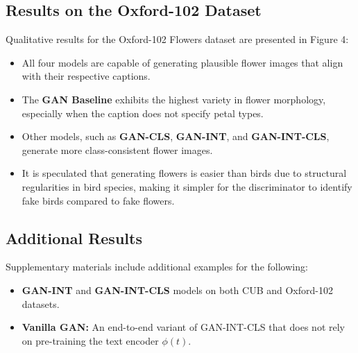\subsection*{Results on the Oxford-102 Dataset}
Qualitative results for the Oxford-102 Flowers dataset are presented in Figure 4:  
\begin{itemize}
    \item All four models are capable of generating plausible flower images that align with their respective captions.  
    \item The \textbf{GAN Baseline} exhibits the highest variety in flower morphology, especially when the caption does not specify petal types.  
    \item Other models, such as \textbf{GAN-CLS}, \textbf{GAN-INT}, and \textbf{GAN-INT-CLS}, generate more class-consistent flower images.  
    \item It is speculated that generating flowers is easier than birds 
    due to structural regularities in bird species, making it simpler 
    for the discriminator to identify fake birds compared to fake flowers.  
\end{itemize}

\subsection*{Additional Results}
Supplementary materials include additional examples for the following:  
\begin{itemize}
    \item \textbf{GAN-INT} and \textbf{GAN-INT-CLS} models on both CUB and Oxford-102 datasets.  
    \item \textbf{Vanilla GAN:} An end-to-end variant of GAN-INT-CLS that does not rely on pre-training the text encoder \(\phi(t)\).  
\end{itemize}
